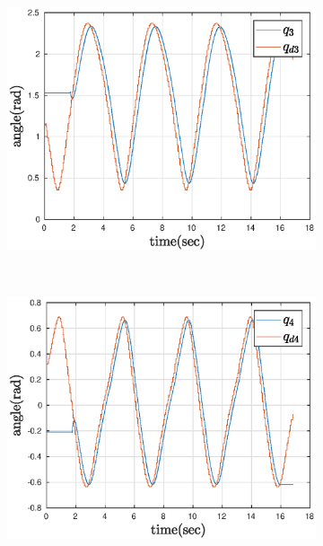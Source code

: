 \begin{figure}[htbp]
\begin{subfigure}[htbp]{0.45\textwidth}
        \caption{ }
    \end{subfigure}
    ~
    \centering
    \begin{subfigure}[htbp]{0.45\textwidth}
        \centering
        \includegraphics[width = \picsSiz\linewidth]{img/pathF3.eps}
        \caption{ }
    \end{subfigure}
    ~ 
    \begin{subfigure}[htbp]{0.45\textwidth}
        \centering
        \includegraphics[width = \picsSiz\linewidth]{img/pathF4.eps}
        \caption{ }
    \end{subfigure}
    ~
    \begin{subfigure}[htbp]{0.45\textwidth}

\end{subfigure}
\end{figure}
